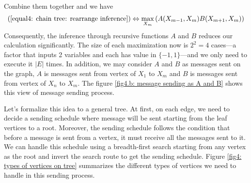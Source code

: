 Combine them together and we have
\begin{align}
	(\ref{equal4: chain tree: rearrange inference}) \Leftrightarrow \max_{X_m}{\left( 
		A(X_{m-1}, X_m) B(X_{m+1}, X_m) 
		\right)}
\end{align}
Consequently, the inference through recursive functions $A$ and $B$ reduces our calculation significantly. The size of each maximization now is $2^2 = 4$ cases---a factor that inputs 2 variables and each has value in $\{-1, 1\}$---and we only need to execute it $|E|$ times. In addition, we may consider $A$ and $B$ as messages sent on the graph, $A$ is messages sent from vertex of $X_1$ to $X_m$ and $B$ is messages sent from vertex of $X_n$ to $X_m$. The figure \ref{fig4.b: message sending as A and B} shows this view of message sending process. 

Let's formalize this idea to a general tree. At first, on each edge, we need to decide a sending schedule where message will be sent starting from the leaf vertices to a root. Moreover, the sending schedule follows the condition that before a message is sent from a vertex, it must receive all the messages sent to it. We can handle this schedule using a breadth-first search starting from any vertex as the root and invert the search route to get the sending schedule. Figure \ref{fig4: types of vertices on tree} summarizes the different types of vertices we need to handle in this sending process.

